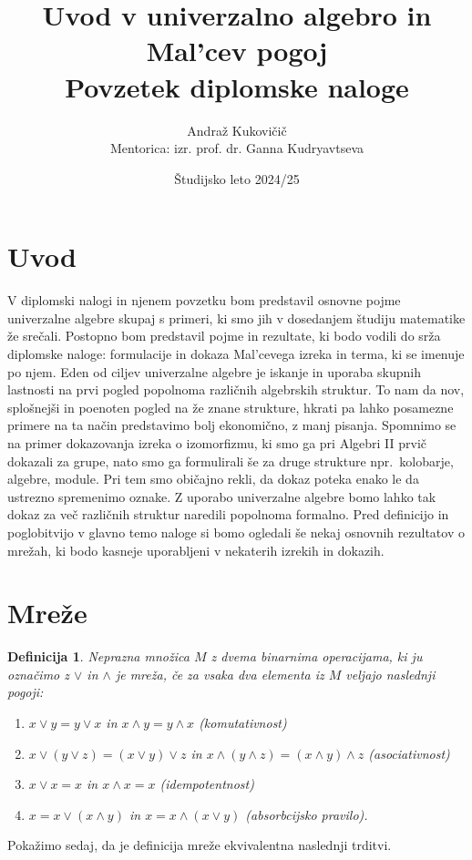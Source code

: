 \documentclass[a4paper,11pt]{article}
\title{Uvod v univerzalno algebro in Mal'cev pogoj \\ 
\Large Povzetek diplomske naloge}
\author{Andraž Kukovičič \\
Mentorica: izr. prof. dr. Ganna Kudryavtseva}
\date{Študijsko leto 2024/25}
\newtheorem{definicija}{Definicija}
\begin{document}


\maketitle

\section{Uvod}
V diplomski nalogi in njenem povzetku bom predstavil osnovne pojme univerzalne algebre skupaj s primeri, 
ki smo jih v dosedanjem študiju matematike že srečali. 
Postopno bom predstavil pojme in rezultate, ki bodo vodili do srža diplomske naloge:
formulacije in dokaza Mal'cevega izreka in terma, ki se imenuje po njem.
Eden od ciljev univerzalne algebre je iskanje in uporaba skupnih lastnosti na prvi pogled popolnoma
različnih algebrskih struktur. To nam da nov, splošnejši in poenoten pogled na že znane strukture, hkrati pa lahko 
posamezne primere na ta način predstavimo bolj ekonomično, z manj pisanja. 
Spomnimo se na primer dokazovanja izreka o izomorfizmu, ki smo ga pri Algebri II prvič dokazali za grupe, nato 
smo ga formulirali še za druge strukture npr.\ kolobarje, algebre, module. Pri tem smo običajno rekli, da dokaz poteka 
enako le da ustrezno spremenimo oznake. Z uporabo univerzalne algebre bomo lahko tak dokaz za več različnih struktur 
naredili popolnoma formalno. 
Pred definicijo in poglobitvijo v glavno temo naloge si bomo ogledali še nekaj osnovnih rezultatov o mrežah, ki bodo 
kasneje uporabljeni v nekaterih izrekih in dokazih.

\section{Mreže}
\begin{definicija}
    Neprazna množica $M$ z dvema binarnima operacijama, ki ju označimo z $\vee$ in $\wedge$ je \emph{mreža}, če 
za vsaka dva elementa iz $M$ veljajo naslednji pogoji:\\
\begin{enumerate} 
    \item[$$M1$$] $x \vee y = y \vee x$ in $x \wedge y = y \wedge x$ (komutativnost)
    \item[$$M2$$] $x\vee \left(y \vee z\right) = \left(x \vee y\right)\vee z$ in 
    $x \wedge \left(y \wedge z\right) = \left(x \wedge y\right)\wedge z$ (asociativnost)
    \item[$$M3$$] $x \vee x = x$ in $x \wedge x = x$ (idempotentnost)
    \item[$$M4$$] $x = x \vee \left(x \wedge y\right)$ in $x = x \wedge \left(x \vee y\right)$ (absorbcijsko pravilo).\\
\end{enumerate}
\end{definicija}
Pokažimo sedaj, da je definicija mreže ekvivalentna naslednji trditvi.
\end{document}
